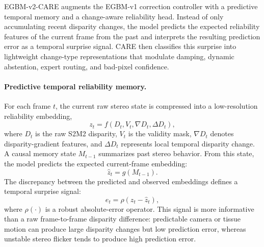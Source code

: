 \documentclass[11pt,a4paper]{article}
\begin{document}
EGBM-v2-CARE augments the EGBM-v1 correction controller with a predictive
temporal memory and a change-aware reliability head. Instead of only accumulating
recent disparity changes, the model predicts the expected reliability features of
the current frame from the past and interprets the resulting prediction error as
a temporal surprise signal. CARE then classifies this surprise into lightweight
change-type representations that modulate damping, dynamic abstention, expert
routing, and bad-pixel confidence.

\paragraph{Predictive temporal reliability memory.}
For each frame $t$, the current raw stereo state is compressed into a
low-resolution reliability embedding,
\begin{equation}
    z_t = f(D_t, V_t, \nabla D_t, \Delta D_t),
\end{equation}
where $D_t$ is the raw S2M2 disparity, $V_t$ is the validity mask,
$\nabla D_t$ denotes disparity-gradient features, and $\Delta D_t$ represents
local temporal disparity change. A causal memory state $M_{t-1}$ summarizes past
stereo behavior. From this state, the model predicts the expected current-frame
embedding:
\begin{equation}
    \hat{z}_t = g(M_{t-1}).
\end{equation}
The discrepancy between the predicted and observed embeddings defines a temporal
surprise signal:
\begin{equation}
    e_t = \rho(z_t - \hat{z}_t),
\end{equation}
where $\rho(\cdot)$ is a robust absolute-error operator. This signal is more
informative than a raw frame-to-frame disparity difference: predictable camera or
tissue motion can produce large disparity changes but low prediction error,
whereas unstable stereo flicker tends to produce high prediction error.
\end{document}
